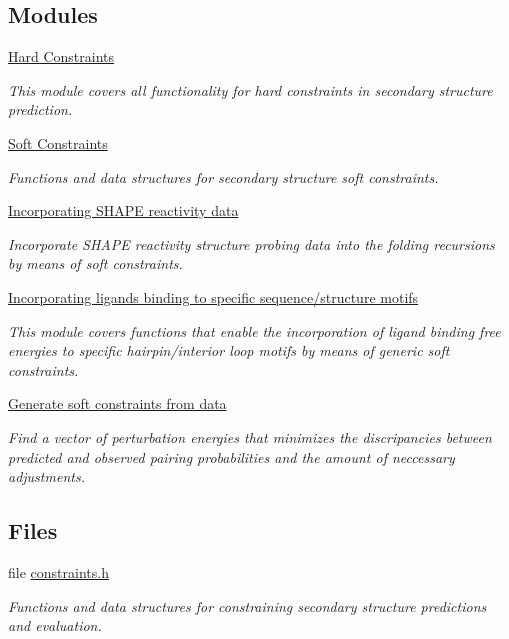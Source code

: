 \subsection*{Modules}
\begin{DoxyCompactItemize}
\item 
\hyperlink{group__hard__constraints}{Hard Constraints}
\begin{DoxyCompactList}\small\item\em This module covers all functionality for hard constraints in secondary structure prediction. \end{DoxyCompactList}\item 
\hyperlink{group__soft__constraints}{Soft Constraints}
\begin{DoxyCompactList}\small\item\em Functions and data structures for secondary structure soft constraints. \end{DoxyCompactList}\item 
\hyperlink{group__SHAPE__reactivities}{Incorporating S\+H\+A\+P\+E reactivity data}
\begin{DoxyCompactList}\small\item\em Incorporate S\+H\+A\+P\+E reactivity structure probing data into the folding recursions by means of soft constraints. \end{DoxyCompactList}\item 
\hyperlink{group__ligands}{Incorporating ligands binding to specific sequence/structure motifs}
\begin{DoxyCompactList}\small\item\em This module covers functions that enable the incorporation of ligand binding free energies to specific hairpin/interior loop motifs by means of generic soft constraints. \end{DoxyCompactList}\item 
\hyperlink{group__perturbation}{Generate soft constraints from data}
\begin{DoxyCompactList}\small\item\em Find a vector of perturbation energies that minimizes the discripancies between predicted and observed pairing probabilities and the amount of neccessary adjustments. \end{DoxyCompactList}\end{DoxyCompactItemize}
\subsection*{Files}
\begin{DoxyCompactItemize}
\item 
file \hyperlink{constraints_8h}{constraints.\+h}
\begin{DoxyCompactList}\small\item\em Functions and data structures for constraining secondary structure predictions and evaluation. \end{DoxyCompactList}\end{DoxyCompactItemize}
